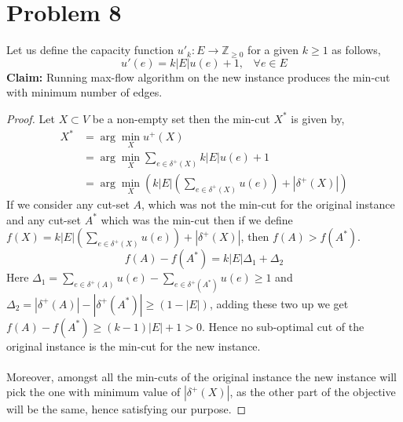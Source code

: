 \documentclass{article}
\begin{document}
    \section{Problem 8}
    Let us define the capacity function $u'_k : E\rightarrow \mathbb{Z}_{\ge 0}$ for a given $ k \ge 1$ as follows, 
    \begin{equation*}
        u'(e) = k|E|u(e) + 1, \, \, \, \, \, \forall e \in E
    \end{equation*}
    \textbf{Claim:} Running max-flow algorithm on the new instance produces the min-cut with minimum number of edges. 
    \begin{proof}
        Let $X\subset V$ be a non-empty set then the min-cut $X^*$ is given by, 
        \begin{equation*}
            \begin{split}
                X^* &= \arg \min_{X} u^+(X)\\
                &= \arg \min_{X} \sum_{e \in \delta^+(X)}k|E|u(e) + 1\\
                &= \arg \min_{X} \left( k|E|\left(\sum_{e \in \delta^+(X)}u(e)\right) + |\delta^+(X)|\right)
            \end{split}
        \end{equation*}
        If we consider any cut-set $A$, which was not the min-cut for the original instance and any cut-set $A^*$ which was the min-cut then  if we define $f(X) = k|E|\left(\sum_{e \in \delta^+(X)}u(e)\right) + |\delta^+(X)|$, then $f(A) > f(A^*)$. 
        \begin{equation*}
            f(A) - f(A^*) = k|E|\Delta_1 + \Delta_2
        \end{equation*}
        Here $\Delta_1 =\sum_{e \in \delta^+(A)}u(e) - \sum_{e \in \delta^+(A^*)}u(e) \ge 1$ and $\Delta_2 = |\delta^+(A)| - |\delta^+(A^*)| \ge (1-|E|)$, adding these two up we get $f(A)-f(A^*) \ge (k-1)|E| + 1 > 0$. Hence no sub-optimal cut of the original instance is the min-cut for the new instance.\\\\
        Moreover, amongst all the min-cuts of the original instance the new instance will pick the one with minimum value of $|\delta^+(X)|$, as the other part of the objective will be the same, hence satisfying our purpose. 
    \end{proof}
\end{document}
